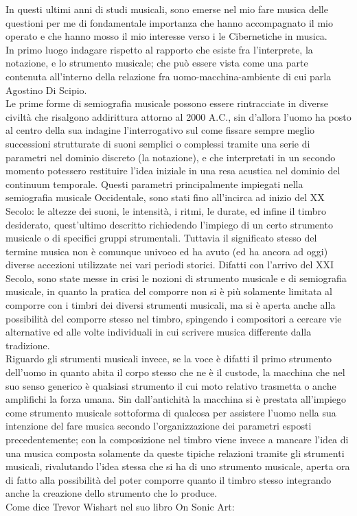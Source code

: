 In questi ultimi anni di studi musicali, sono emerse nel mio fare musica 
delle questioni per me di fondamentale importanza che hanno accompagnato il mio operato
e che hanno mosso il mio interesse verso i le Cibernetiche in musica. \\
In primo luogo indagare rispetto al rapporto che esiste fra l'interprete, la notazione, e lo strumento musicale;
che può essere vista come una parte contenuta all'interno della relazione fra uomo-macchina-ambiente di cui parla
Agostino Di Scipio. \\
Le prime forme di semiografia musicale possono essere rintracciate in diverse civiltà 
che risalgono addirittura attorno al 2000 A.C.,
sin d'allora l'uomo ha posto al centro della sua indagine l'interrogativo sul come fissare sempre meglio 
successioni strutturate di suoni semplici o complessi tramite una serie di parametri nel dominio discreto (la notazione), 
e che interpretati in un secondo momento potessero restituire l'idea iniziale in una resa 
acustica nel dominio del continuum temporale.
Questi parametri principalmente impiegati nella semiografia musicale Occidentale, 
sono stati fino all'incirca ad inizio del XX Secolo: 
le altezze dei suoni, le intensità, i ritmi, le durate, ed infine il timbro desiderato, 
quest'ultimo descritto richiedendo l'impiego di un certo strumento musicale o di specifici gruppi strumentali.
Tuttavia il significato stesso del termine musica non è comunque univoco ed ha avuto (ed ha ancora ad oggi) 
diverse accezioni utilizzate nei vari periodi storici.
Difatti con l'arrivo del XXI Secolo, sono state messe in crisi le nozioni di strumento musicale e di semiografia musicale, 
in quanto la pratica del comporre non si è più solamente limitata al comporre 
con i timbri dei diversi strumenti musicali, ma si è aperta anche alla possibilità del comporre stesso nel timbro, 
spingendo i compositori a cercare vie alternative ed alle volte individuali in cui scrivere musica differente dalla tradizione.\\
Riguardo gli strumenti musicali invece, se la voce è difatti il primo strumento dell'uomo in quanto 
abita il corpo stesso che ne è il custode, la macchina che nel suo senso generico è qualsiasi strumento 
il cui moto relativo trasmetta o anche amplifichi la forza umana.
Sin dall'antichità la macchina si è prestata all'impiego come strumento musicale sottoforma di qualcosa per assistere l'uomo nella 
sua intenzione del fare musica secondo l'organizzazione dei parametri esposti precedentemente; 
con la composizione nel timbro viene invece a mancare l'idea 
di una musica composta solamente da queste tipiche relazioni tramite gli strumenti musicali, 
rivalutando l'idea stessa che si ha di uno strumento musicale, aperta ora di fatto alla possibilità 
del poter comporre quanto il timbro stesso integrando anche la creazione dello strumento che lo produce. \\
Come dice Trevor Wishart nel suo libro On Sonic Art:

